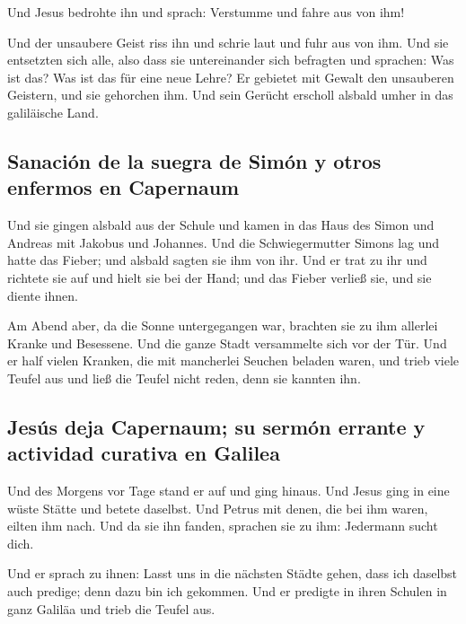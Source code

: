  Und Jesus bedrohte ihn und sprach: Verstumme und fahre
aus von ihm!

 Und der unsaubere Geist riss ihn und schrie laut und
fuhr aus von ihm.  Und sie entsetzten sich alle, also
dass sie untereinander sich befragten und sprachen: Was ist das? Was ist
das für eine neue Lehre? Er gebietet mit Gewalt den unsauberen Geistern,
und sie gehorchen ihm.  Und sein Gerücht erscholl alsbald
umher in das galiläische Land.

\hypertarget{sanaciuxf3n-de-la-suegra-de-simuxf3n-y-otros-enfermos-en-capernaum}{%
\subsection{Sanación de la suegra de Simón y otros enfermos en
Capernaum}\label{sanaciuxf3n-de-la-suegra-de-simuxf3n-y-otros-enfermos-en-capernaum}}

 Und sie gingen alsbald aus der Schule und kamen in das
Haus des Simon und Andreas mit Jakobus und Johannes.  Und
die Schwiegermutter Simons lag und hatte das Fieber; und alsbald sagten
sie ihm von ihr.  Und er trat zu ihr und richtete sie auf
und hielt sie bei der Hand; und das Fieber verließ sie, und sie diente
ihnen.

 Am Abend aber, da die Sonne untergegangen war, brachten
sie zu ihm allerlei Kranke und Besessene.  Und die ganze
Stadt versammelte sich vor der Tür.  Und er half vielen
Kranken, die mit mancherlei Seuchen beladen waren, und trieb viele
Teufel aus und ließ die Teufel nicht reden, denn sie kannten ihn.

\hypertarget{jesuxfas-deja-capernaum-su-sermuxf3n-errante-y-actividad-curativa-en-galilea}{%
\subsection{Jesús deja Capernaum; su sermón errante y actividad curativa
en
Galilea}\label{jesuxfas-deja-capernaum-su-sermuxf3n-errante-y-actividad-curativa-en-galilea}}

 Und des Morgens vor Tage stand er auf und ging hinaus.
Und Jesus ging in eine wüste Stätte und betete daselbst. 
Und Petrus mit denen, die bei ihm waren, eilten ihm nach.
 Und da sie ihn fanden, sprachen sie zu ihm: Jedermann
sucht dich.

 Und er sprach zu ihnen: Lasst uns in die nächsten Städte
gehen, dass ich daselbst auch predige; denn dazu bin ich gekommen.
 Und er predigte in ihren Schulen in ganz Galiläa und
trieb die Teufel aus.

